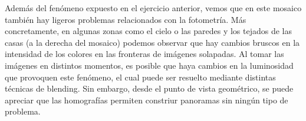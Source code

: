 \documentclass[10pt,a4paper]{article}
\begin{document}
Además del fenómeno expuesto en el ejercicio anterior, vemos que en este mosaico también hay ligeros problemas relacionados con la fotometría. Más concretamente, en algunas zonas como el cielo o las paredes y los tejados de las casas (a la derecha del mosaico) podemos observar que hay cambios bruscos en la intensidad de los colores en las fronteras de imágenes solapadas. Al tomar las imágenes en distintos momentos, es posible que haya cambios en la luminosidad que provoquen este fenómeno, el cual puede ser resuelto mediante distintas técnicas de blending. Sin embargo, desde el punto de vista geométrico, se puede apreciar que las homografías permiten constriur panoramas sin ningún tipo de problema.
\end{document}
